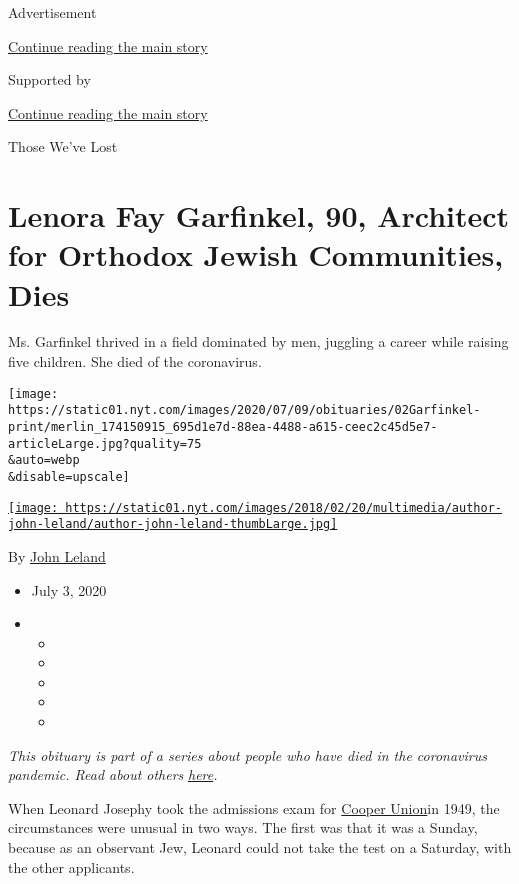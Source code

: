 Advertisement

\protect\hyperlink{after-top}{Continue reading the main story}

Supported by

\protect\hyperlink{after-sponsor}{Continue reading the main story}

Those We've Lost

\hypertarget{lenora-fay-garfinkel-90-architect-for-orthodox-jewish-communities-dies}{%
\section{Lenora Fay Garfinkel, 90, Architect for Orthodox Jewish
Communities,
Dies}\label{lenora-fay-garfinkel-90-architect-for-orthodox-jewish-communities-dies}}

Ms. Garfinkel thrived in a field dominated by men, juggling a career
while raising five children. She died of the coronavirus.

\texttt{[image: https://static01.nyt.com/images/2020/07/09/obituaries/02Garfinkel-print/merlin\_174150915\_695d1e7d-88ea-4488-a615-ceec2c45d5e7-articleLarge.jpg?quality=75\\\&auto=webp\\\&disable=upscale]}

\href{https://www.nytimes.com/by/john-leland}{\texttt{[image: https://static01.nyt.com/images/2018/02/20/multimedia/author-john-leland/author-john-leland-thumbLarge.jpg]}}

By \href{https://www.nytimes.com/by/john-leland}{John Leland}

\begin{itemize}
\item
  July 3, 2020
\item
  \begin{itemize}
  \item
  \item
  \item
  \item
  \item
  \end{itemize}
\end{itemize}

\emph{This obituary is part of a series about people who have died in
the coronavirus pandemic. Read about others}
\href{https://www.nytimes.com/interactive/2020/obituaries/people-died-coronavirus-obituaries.html}{\emph{here}}\emph{.}

When Leonard Josephy took the admissions exam for
\href{http://cooper.edu/welcome}{Cooper Union}in 1949, the circumstances
were unusual in two ways. The first was that it was a Sunday, because as
an observant Jew, Leonard could not take the test on a Saturday, with
the other applicants.

